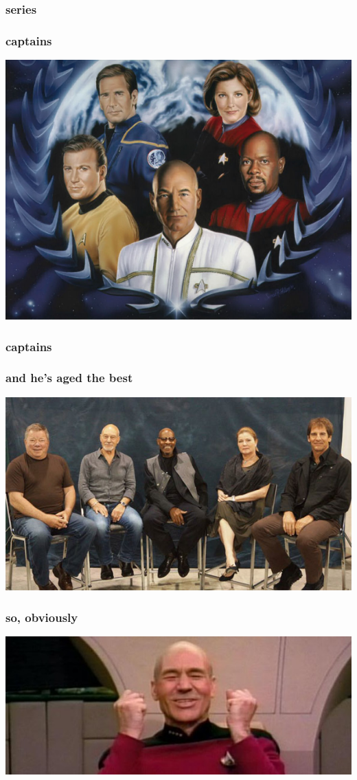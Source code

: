 \documentclass{beamer}
\begin{document}
\begin{frame}
  \frametitle{series}
  
\end{frame}

\begin{frame}
  \frametitle{captains}
  \includegraphics[height = 0.8\textheight, keepaspectratio = true]{figure/Star-Trek-Captains}
\end{frame}

\begin{frame}
  \frametitle{captains}
  
\end{frame}

\begin{frame}
  \frametitle{and he's aged the best}
  \includegraphics[width = \textwidth, height = 0.8\textheight, keepaspectratio = true]{figure/AllTheCaptains}
\end{frame}

\begin{frame}
  \frametitle{so, obviously}
  \includegraphics[width = \textwidth, keepaspectratio = true]{figure/win}
\end{frame}
\end{document}
